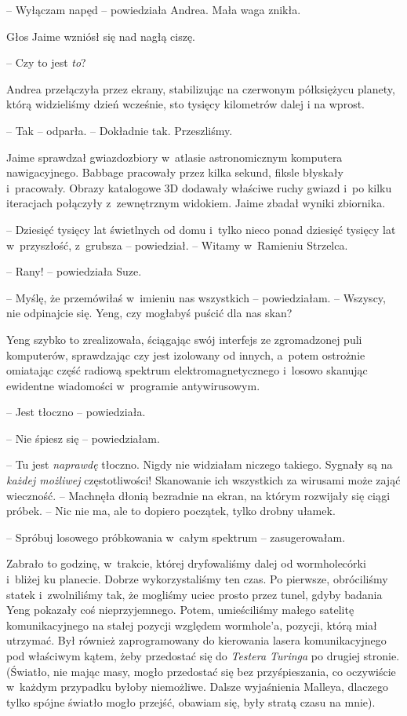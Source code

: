 \documentclass[oneside,polish,11pt,sfheadings]{mwbk}
\begin{document}
-- Wyłączam napęd -- powiedziała Andrea. Mała waga znikła.

Głos Jaime wzniósł się nad nagłą ciszę.

-- Czy to jest \textit{to}?

Andrea przełączyła przez ekrany, stabilizując na czerwonym półksiężycu
planety, którą widzieliśmy dzień wcześnie, sto tysięcy kilometrów dalej
i na wprost.

-- Tak -- odparła. -- Dokładnie tak. Przeszliśmy.

Jaime sprawdzał gwiazdozbiory w~atlasie astronomicznym komputera
nawigacyjnego. Babbage pracowały przez kilka sekund, fiksle błyskały i~pracowały. Obrazy katalogowe 3D dodawały właściwe ruchy gwiazd i~po
kilku iteracjach połączyły z~zewnętrznym widokiem. Jaime zbadał wyniki
zbiornika.

-- Dziesięć tysięcy lat świetlnych od domu i~tylko nieco ponad dziesięć
tysięcy lat w~przyszłość, z~grubsza -- powiedział. -- Witamy w~Ramieniu
Strzelca.

-- Rany! -- powiedziała Suze.

-- Myślę, że przemówiłaś w~imieniu nas wszystkich -- powiedziałam. -- Wszyscy, nie odpinajcie się. Yeng, czy mogłabyś puścić dla nas skan?

Yeng szybko to zrealizowała, ściągając swój interfejs ze zgromadzonej
puli komputerów, sprawdzając czy jest izolowany od innych, a~potem
ostrożnie omiatając część radiową spektrum elektromagnetycznego i~losowo
skanując ewidentne wiadomości w~programie antywirusowym.

-- Jest tłoczno -- powiedziała.

-- Nie śpiesz się -- powiedziałam.

-- Tu jest \textit{naprawdę} tłoczno. Nigdy nie widziałam niczego takiego.
Sygnały są na \textit{każdej możliwej} częstotliwości! Skanowanie ich
wszystkich za wirusami może zająć wieczność. -- Machnęła dłonią bezradnie
na ekran, na którym rozwijały się ciągi próbek. -- Nic nie ma, ale to
dopiero początek, tylko drobny ułamek.

-- Spróbuj losowego próbkowania w~całym spektrum -- zasugerowałam.

Zabrało to godzinę, w~trakcie, której dryfowaliśmy dalej od
wormhole\dywiz córki i~bliżej ku planecie. Dobrze wykorzystaliśmy ten czas. Po
pierwsze, obróciliśmy statek i~zwolniliśmy tak, że mogliśmy uciec prosto
przez tunel, gdyby badania Yeng pokazały coś nieprzyjemnego. Potem,
umieściliśmy małego satelitę komunikacyjnego na stałej pozycji względem
wormhole'a, pozycji, którą miał utrzymać. Był również zaprogramowany do
kierowania lasera komunikacyjnego pod właściwym kątem, żeby przedostać
się do \textit{Testera Turinga} po drugiej stronie. (Światło, nie mając
masy, mogło przedostać się bez przyśpieszania, co oczywiście w~każdym
przypadku byłoby niemożliwe. Dalsze wyjaśnienia Malleya, dlaczego tylko
spójne światło mogło przejść, obawiam się, były stratą czasu na mnie).
\end{document}
